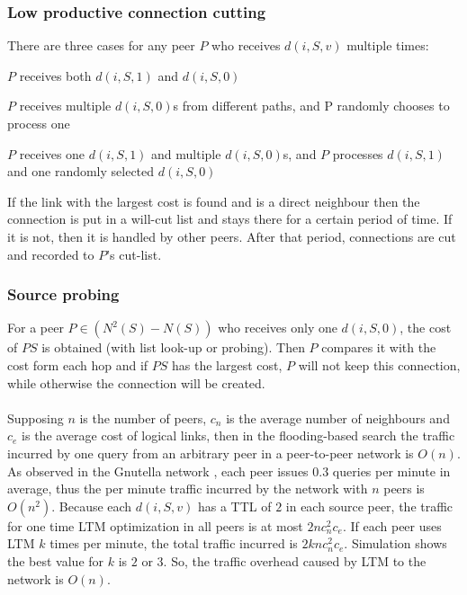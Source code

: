 \documentclass[a4paper,10pt]{article}
\begin{document}
\subsubsection*{Low productive connection cutting}
There are three cases for any peer $P$ who receives $d(i, S, v)$ multiple times:
\begin{inparaenum}
  \item $P$ receives both $d(i, S, 1)$ and $d(i, S, 0)$
  \item $P$ receives multiple $d(i, S, 0)$s from different paths, and P randomly chooses to process one
  \item $P$ receives one $d(i, S, 1)$ and multiple $d(i, S, 0)$s, and $P$ processes $d(i, S, 1)$ and one randomly selected $d(i, S, 0)$
\end{inparaenum}
If the link with the largest cost is found and is a direct neighbour then the connection is put in a will-cut list and stays there for a certain period of time. If it is not, then it is handled by other peers. After that period, connections are cut and recorded to $P$'s cut-list.

\subsubsection*{Source probing}
For a peer $P\in(N^2(S) - N(S))$ who receives only one $d(i, S, 0)$, the cost of $PS$ is obtained (with list look-up or probing). Then $P$ compares it with the cost form each hop and if $PS$ has the largest cost, $P$ will not keep this connection, while otherwise the connection will be created.

\paragraph{}
Supposing $n$ is the number of peers, $c_n$ is the average number of neighbours and $c_e$ is the average cost of logical links, then in the flooding-based search the traffic incurred by one query from an arbitrary peer in a peer-to-peer network is $O(n)$. As observed in the Gnutella network \cite{sripanidkulchai_gnutella_2001}, each peer issues $0.3$ queries per minute in average, thus the per minute traffic incurred by the network with $n$ peers is $O(n^2)$. Because each $d(i, S, v)$ has a TTL of $2$ in each source peer, the traffic for one time LTM optimization in all peers is at most $2nc_n^2c_e$. If each peer uses LTM $k$ times per minute, the total traffic incurred is $2knc_n^2c_e$. Simulation shows the best value for $k$ is $2$ or $3$. So, the traffic overhead caused by LTM to the network is $O(n)$.
\end{document}
